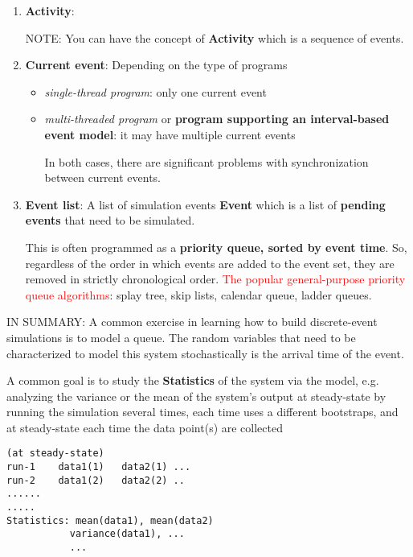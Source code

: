 \begin{enumerate}
  When we analyze the result, at each simulation, we ignore (disregard) the
  events that occur before the steady state is reached.
  
  \item {\bf Activity}:
  
  NOTE: You can have the concept of {\bf Activity} which is a sequence of
  events. 
  

  \item {\bf Current event}: 
  Depending on the type of programs
  \begin{itemize}
    \item {\it single-thread program}: only one current event
    
    \item {\it multi-threaded program} or {\bf program supporting an
    interval-based event model}: it may have multiple current events
    
    In both cases, there are significant problems with synchronization between
    current events.
  \end{itemize}
  
    
  \item {\bf Event list}:
  A list of simulation events {\bf Event} which is a list of {\bf pending
  events}
  that need to be simulated. 
  
  This is often programmed as a {\bf  priority queue, sorted by event time}.
  So, regardless of the order in which events are added to the event set, they
  are removed in strictly chronological order. \textcolor{red}{The popular
  general-purpose priority queue algorithms}: splay tree, skip lists, calendar
  queue, ladder queues.
  
\end{enumerate}
IN SUMMARY: A common exercise in learning how to build discrete-event
simulations is to model a queue. The random variables that need to be
characterized to model this system stochastically is the arrival time of the
event.

A common goal is to study the {\bf Statistics} of the system via the model, e.g.
analyzing the variance or the mean of the system's output at steady-state by
running the simulation several times, each time uses a different bootstraps,
and at steady-state each time the data point(s) are collected
\begin{verbatim}
(at steady-state)
run-1    data1(1)   data2(1) ...
run-2    data1(2)   data2(2) ..
......
.....
Statistics: mean(data1), mean(data2)
           variance(data1), ...
           ...
\end{verbatim}

